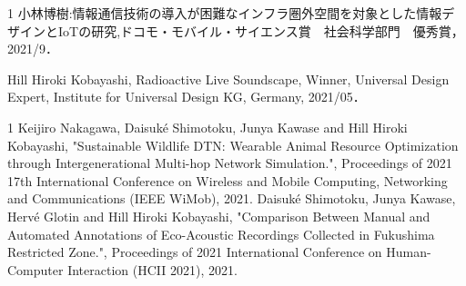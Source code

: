 \begin{受賞}{1}
小林博樹:情報通信技術の導入が困難なインフラ圏外空間を対象とした情報デザインとIoTの研究,ドコモ・モバイル・サイエンス賞　社会科学部門　優秀賞，2021/9．

Hill Hiroki Kobayashi, Radioactive Live Soundscape, Winner, Universal Design Expert, Institute for Universal Design KG, Germany, 2021/05．
\end{受賞}


\begin{査読付}{1}
Keijiro Nakagawa, Daisuk\'e Shimotoku, Junya Kawase and Hill Hiroki Kobayashi, "Sustainable Wildlife DTN: Wearable Animal Resource Optimization through Intergenerational Multi-hop Network Simulation.", Proceedings of 2021 17th International Conference on Wireless and Mobile Computing, Networking and Communications (IEEE WiMob), 2021.
Daisuk\'e Shimotoku, Junya Kawase, Herv\'e Glotin and Hill Hiroki Kobayashi, "Comparison Between Manual and Automated Annotations of Eco-Acoustic Recordings Collected in Fukushima Restricted Zone.", Proceedings of 2021 International Conference on Human-Computer Interaction (HCII 2021), 2021.  
\end{査読付}